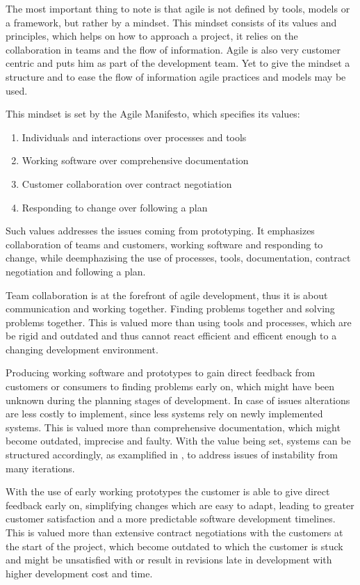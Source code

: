 \documentclass[runningheads]{llncs}
\begin{document}
The most important thing to note is that agile is not defined by tools, models or a framework, but rather by a mindset\cite{ref_agilemanifesto}. 
This mindset consists  of its values and principles, which helps on how to approach a project, it relies on the collaboration 
in teams and the flow of information. Agile is also very customer centric and puts him as part of the development team. Yet to 
give the mindset a structure and to ease the flow of information agile practices and models may be used.

This mindset is set by the Agile Manifesto\cite{ref_agilemanifesto}, which specifies its values:
\begin{enumerate}
  \item Individuals and interactions over processes and tools
  \item Working software over comprehensive documentation
  \item Customer collaboration over contract negotiation
  \item Responding to change over following a plan 
\end{enumerate}
Such values addresses the issues coming from prototyping. It emphasizes collaboration of teams and customers, working software
and responding to change, while deemphazising the use of processes, tools, documentation, contract negotiation and following a plan.

Team collaboration is at the forefront of agile development, thus it is about communication and working together. 
Finding problems together and solving problems together. This is valued more than using tools and processes, which are be rigid and outdated
and thus cannot react efficient and efficent enough to a changing development environment.

Producing working software and prototypes to gain direct feedback from customers or consumers to finding problems early on,
which might have been unknown during the planning stages of development. In case of issues alterations are less costly to implement, 
since less systems rely on newly implemented systems. This is valued more than comprehensive documentation, which might become outdated, 
imprecise and faulty. With the value being set, systems can be structured accordingly, as examplified in \cite{ref_health}, to address
issues of instability from many iterations.

With the use of early working prototypes the customer is able to give direct feedback early on, simplifying changes which are easy to adapt,
leading to greater customer satisfaction and a more predictable software development timelines. This is valued more than extensive 
contract negotiations with the customers at the start of the project, which become outdated to which the customer is stuck and might 
be unsatisfied with or result in revisions late in development with higher development cost and time.
\end{document}
